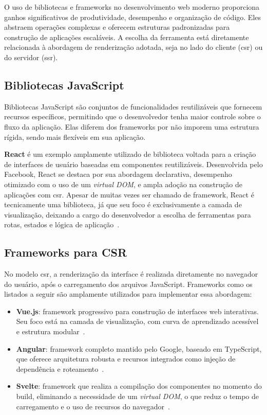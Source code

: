 O uso de bibliotecas e frameworks no desenvolvimento web moderno proporciona ganhos significativos de produtividade, desempenho e organização de código. Eles abstraem operações complexas e oferecem estruturas padronizadas para construção de aplicações escaláveis. A escolha da ferramenta está diretamente relacionada à abordagem de renderização adotada, seja no lado do cliente (\acrshort{csr}) ou do servidor (\acrshort{ssr}).

\subsection{Bibliotecas JavaScript}
\label{subsec:bibliotecas-js}

Bibliotecas JavaScript são conjuntos de funcionalidades reutilizáveis que fornecem recursos específicos, permitindo que o desenvolvedor tenha maior controle sobre o fluxo da aplicação. Elas diferem dos frameworks por não imporem uma estrutura rígida, sendo mais flexíveis em sua aplicação.

\textbf{React} é um exemplo amplamente utilizado de biblioteca voltada para a criação de interfaces de usuário baseadas em componentes reutilizáveis. Desenvolvida pelo Facebook, React se destaca por sua abordagem declarativa, desempenho otimizado com o uso de um \textit{virtual DOM}, e ampla adoção na construção de aplicações com \acrshort{csr}. Apesar de muitas vezes ser chamado de framework, React é tecnicamente uma biblioteca, já que seu foco é exclusivamente a camada de visualização, deixando a cargo do desenvolvedor a escolha de ferramentas para rotas, estados e lógica de aplicação~\cite{react2025}.

\subsection{Frameworks para CSR}
\label{subsec:frameworks-csr}

No modelo \acrshort{csr}, a renderização da interface é realizada diretamente no navegador do usuário, após o carregamento dos arquivos JavaScript. Frameworks como os listados a seguir são amplamente utilizados para implementar essa abordagem:

\begin{itemize}
    \item \textbf{Vue.js}: framework progressivo para construção de interfaces web interativas. Seu foco está na camada de visualização, com curva de aprendizado acessível e estrutura modular~\cite{vue2025}.
    
    \item \textbf{Angular}: framework completo mantido pelo Google, baseado em TypeScript, que oferece arquitetura robusta e recursos integrados como injeção de dependência e roteamento~\cite{angular2025}.
    
    \item \textbf{Svelte}: framework que realiza a compilação dos componentes no momento do build, eliminando a necessidade de um \textit{virtual DOM}, o que reduz o tempo de carregamento e o uso de recursos do navegador~\cite{svelte2025}.
\end{itemize}

